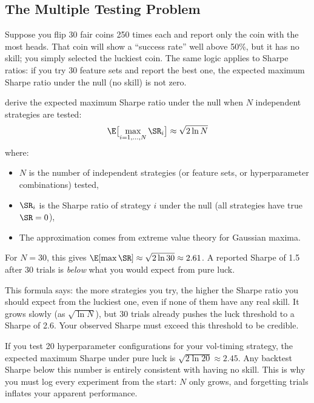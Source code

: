 \subsection{The Multiple Testing Problem}

\begin{intuition}
Suppose you flip 30 fair coins 250 times each and report only the coin with the most heads.
That coin will show a ``success rate'' well above 50\%, but it has no skill; you simply selected the luckiest coin.
The same logic applies to Sharpe ratios: if you try 30 feature sets and report the best one, the expected maximum Sharpe ratio under the null (no skill) is not zero.
\end{intuition}

\citet{Bailey2014DSR} derive the expected maximum Sharpe ratio under the null when $N$ independent strategies are tested:
\begin{equation}
\label{eq:expected-max-sr}
\E\bigl[\max_{i=1,\ldots,N} \SR_i\bigr] \approx \sqrt{2 \ln N}
\end{equation}
where:
\begin{itemize}[nosep]
  \item $N$ is the number of independent strategies (or feature sets, or hyperparameter combinations) tested,
  \item $\SR_i$ is the Sharpe ratio of strategy $i$ under the null (all strategies have true $\SR = 0$),
  \item The approximation comes from extreme value theory for Gaussian maxima.
\end{itemize}

For $N = 30$, this gives $\E[\max \SR] \approx \sqrt{2 \ln 30} \approx 2.61$.
A reported Sharpe of 1.5 after 30 trials is \emph{below} what you would expect from pure luck.

\begin{intuition}
This formula says: the more strategies you try, the higher the Sharpe ratio you should expect from the luckiest one, even if none of them have any real skill.
It grows slowly (as $\sqrt{\ln N}$), but 30 trials already pushes the luck threshold to a Sharpe of 2.6.
Your observed Sharpe must exceed this threshold to be credible.
\end{intuition}

\begin{projectconnection}
If you test 20 hyperparameter configurations for your vol-timing strategy, the expected maximum Sharpe under pure luck is $\sqrt{2 \ln 20} \approx 2.45$.
Any backtest Sharpe below this number is entirely consistent with having no skill.
This is why you must log every experiment from the start: $N$ only grows, and forgetting trials inflates your apparent performance.
\end{projectconnection}

